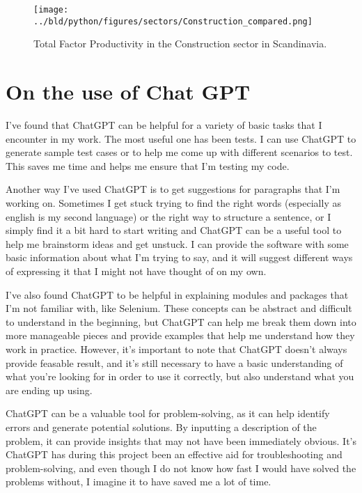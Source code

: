 \documentclass[11pt, a4paper, leqno]{article}
\begin{document}
\begin{figure}[H]

    \centering
    \texttt{[image: ../bld/python/figures/sectors/Construction\_compared.png]}

    \caption{Total Factor Productivity in the Construction sector in Scandinavia.}
    \label{fig:python-predictions}

\end{figure}

\section{On the use of Chat GPT} %
\label{sec:On the use of Chat GPT}

I've found that ChatGPT can be helpful for a variety of basic tasks that I encounter 
in my work. The most useful one has been tests. I can use ChatGPT to generate sample test 
cases or to help me come up with different scenarios to test. This saves me time and helps me 
ensure that I'm testing my code.

Another way I've used ChatGPT is to get suggestions for paragraphs that I'm working on. Sometimes 
I get stuck trying to find the right words (especially as english is my second language) or the right way 
to structure a sentence, or I simply find it a bit hard to start writing and ChatGPT can be a useful tool 
to help me brainstorm ideas and get unstuck. I can provide the software with some basic information about 
what I'm trying to say, and it will suggest different ways of expressing it that I might not have thought 
of on my own.

I've also found ChatGPT to be helpful in explaining modules and packages that I'm not familiar with, 
like Selenium. These concepts can be abstract and difficult to understand in the beginning, but ChatGPT 
can help me break them down into more manageable pieces and provide examples that help me understand how they 
work in practice. However, it's important to note that ChatGPT doesn't always provide feasable result, 
and it's still necessary to have a basic understanding of what you're looking for in order to use it correctly,
but also understand what you are ending up using.

ChatGPT can be a valuable tool for problem-solving, as it can help identify errors and generate potential solutions. 
By inputting a description of the problem, it can provide insights that may not have been immediately obvious. It's 
ChatGPT has during this project been an effective aid for troubleshooting and problem-solving, and even though I do 
not know how fast I would have solved the problems without, I imagine it to have saved me a lot of time.
\end{document}

